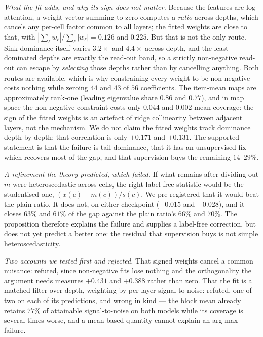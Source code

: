 \emph{What the fit adds, and why its sign does not matter.} Because the features are log-attention, a weight
vector summing to zero computes a \emph{ratio} across depths, which cancels any per-cell factor common to all
layers; the fitted weights are close to that, with $|\sum_\ell w_\ell|/\sum_\ell|w_\ell| = 0.126$ and $0.225$.
But that is not the only route. Sink dominance itself varies $3.2\times$ and $4.4\times$ across depth, and the
least-dominated depths are exactly the read-out band, so a strictly non-negative read-out can escape by
\emph{selecting} those depths rather than by cancelling anything. Both routes are available, which is why
constraining every weight to be non-negative costs nothing while zeroing $44$ and $43$ of $56$ coefficients. The
item-mean maps are approximately rank-one (leading eigenvalue share $0.86$ and $0.77$), and in map space the
non-negative constraint costs only $0.044$ and $0.002$ mean coverage: the sign of the fitted weights is an artefact
of ridge collinearity between adjacent layers, not the mechanism. We do
not claim the fitted weights track dominance depth-by-depth: that correlation is only $+0.171$ and $+0.131$. The
supported statement is that the failure is tail dominance, that it has an unsupervised fix which recovers most of
the gap, and that supervision buys the remaining $14$--$29\%$.

\emph{A refinement the theory predicted, which failed.} If what remains after dividing out $m$ were
heteroscedastic across cells, the right label-free statistic would be the studentised one, $(x(c)-m(c))/s(c)$. We
pre-registered that it would beat the plain ratio. It does not, on either checkpoint ($-0.015$ and $-0.028$), and
it closes $63\%$ and $61\%$ of the gap against the plain ratio's $66\%$ and $70\%$. The proposition therefore
explains the failure and supplies a label-free correction, but does not yet predict a better one: the residual
that supervision buys is not simple heteroscedasticity.

\emph{Two accounts we tested first and rejected.} That signed weights cancel a common nuisance: refuted, since
non-negative fits lose nothing and the orthogonality the argument needs measures $+0.431$ and $+0.388$ rather than
zero. That the fit is a matched filter over depth, weighting by per-layer signal-to-noise: refuted, one of two on
each of its predictions, and wrong in kind --- the block mean already retains $77\%$ of attainable signal-to-noise
on both models while its coverage is several times worse, and a mean-based quantity cannot explain an arg-max
failure.

